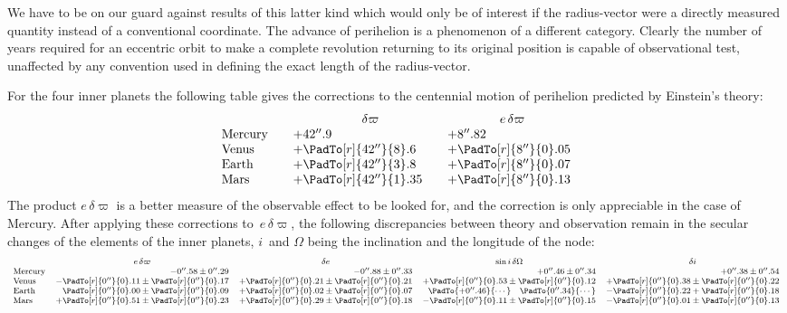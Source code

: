 \documentclass[12pt]{book}
\begin{document}
We have to be on our guard against results of this latter kind which would
only be of interest if the radius-vector were a directly measured quantity instead
of a conventional coordinate. The advance of perihelion is a phenomenon
of a different category. Clearly the number of years required for an eccentric
orbit to make a complete revolution returning to its original position is capable
of observational test, unaffected by any convention used in defining the exact
length of the radius-vector.

For the four inner planets the following table gives the corrections to the
%
%
centennial motion of perihelion predicted by Einstein's theory:
\[
\begin{array}{l@{\qquad}l@{\qquad}l}
  & \multicolumn{1}{c}{\delta\varpi} & \multicolumn{1}{c}{e\, \delta\varpi} \\
\text{Mercury} & +42''.9 & +8''.82 \\
\text{Venus} & +\PadTo[r]{42''}{8}.6 & +\PadTo[r]{8''}{0}.05 \\
\text{Earth} & +\PadTo[r]{42''}{3}.8 & +\PadTo[r]{8''}{0}.07 \\
\text{Mars}  & +\PadTo[r]{42''}{1}.35& +\PadTo[r]{8''}{0}.13 \\
\end{array}
\]
The product $e\, \delta\varpi$ is a better measure of the observable effect to be looked for,
and the correction is only appreciable in the case of Mercury. After applying
these corrections to~$e\, \delta\varpi$, the following discrepancies between theory and observation
remain in the secular changes of the elements of the inner planets,
$i$~and $\Omega$ being the inclination and the longitude of the node:
\[
\footnotesize
\begin{array}{lrrrr}
  & \multicolumn{1}{c}{e\, \delta\varpi} & \multicolumn{1}{c}{\delta e} & \multicolumn{1}{c}{\sin i\, \delta\Omega} & \multicolumn{1}{c}{\delta i} \\
  \text{Mercury} &
  -0''.58 \pm 0''.29 & -0''.88 \pm 0''.33 & +0''.46 \pm 0''.34 & +0''.38 \pm 0''.54 \\
  \text{Venus}   &
  -\PadTo[r]{0''}{0}.11 \pm \PadTo[r]{0''}{0}.17 & +\PadTo[r]{0''}{0}.21 \pm \PadTo[r]{0''}{0}.21 & +\PadTo[r]{0''}{0}.53 \pm \PadTo[r]{0''}{0}.12 & + \PadTo[r]{0''}{0}.38 \pm \PadTo[r]{0''}{0}.22 \\
  \text{Earth}   & \PadTo[r]{0''}{0}.00 \pm \PadTo[r]{0''}{0}.09 & +\PadTo[r]{0''}{0}.02 \pm \PadTo[r]{0''}{0}.07 & \PadTo{+0''.46}{\cdots} \quad \PadTo{0''.34}{\cdots} & -\PadTo[r]{0''}{0}.22 + \PadTo[r]{0''}{0}.18 \\
  \text{Mars}    & +\PadTo[r]{0''}{0}.51 \pm \PadTo[r]{0''}{0}.23 & +\PadTo[r]{0''}{0}.29 \pm \PadTo[r]{0''}{0}.18 & -\PadTo[r]{0''}{0}.11 \pm \PadTo[r]{0''}{0}.15 & -\PadTo[r]{0''}{0}.01 \pm \PadTo[r]{0''}{0}.13 \\
\end{array}
\]
\end{document}
